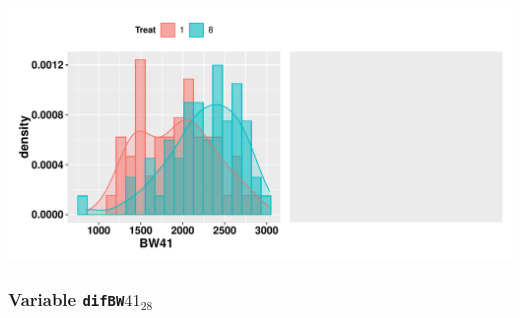 \documentclass[11pt,a4paper]{article}\usepackage[]{graphicx}\usepackage[]{color}
\makeatletter
\def\maxwidth{ %
  \ifdim\Gin@nat@width>\linewidth
    \linewidth
  \else
    \Gin@nat@width
  \fi
}
\newenvironment{knitrout}{}{} %
\makeatother
\begin{document}
\begin{knitrout}
\includegraphics[width=\maxwidth]{figure/unnamed-chunk-10-4} 

\end{knitrout}


\subsubsection{Variable \texttt{difBW$41_{28}$}}
\end{document}

